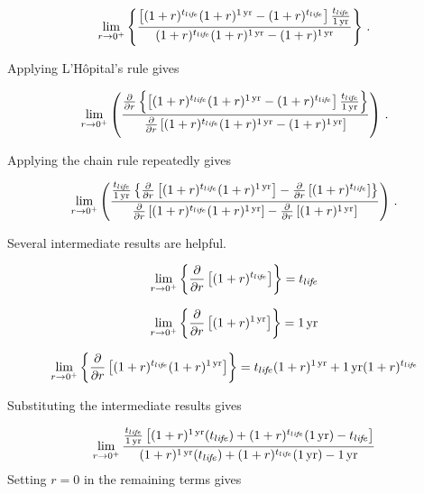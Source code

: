 \begin{equation}
  \lim_{r \to 0^+} \left\{
  \frac{\left[(1 + r)^{\tlife} (1 + r)^{\oneyr} - (1 + r)^{\tlife} \right] \frac{\tlife}{\oneyr}}{(1 + r)^{\tlife} (1 + r)^{\oneyr} - (1 + r)^{\oneyr}}
  \right\} \, .
\end{equation}

Applying L'H\^{o}pital's rule gives

\begin{equation}
  \lim_{r \to 0^+} \left(
  \frac{\frac{\partial}{\partial r} \left\{ \left[(1 + r)^{\tlife} (1 + r)^{\oneyr} - (1 + r)^{\tlife} \right] \frac{\tlife}{\oneyr} \right\}}
  {\frac{\partial}{\partial r} \left[ (1 + r)^{\tlife} (1 + r)^{\oneyr} - (1 + r)^{\oneyr}\right]}
  \right) \, .
\end{equation}

Applying the chain rule repeatedly gives

\begin{equation}
  \lim_{r \to 0^+} \left(
  \frac{\frac{\tlife}{\oneyr} 
      \left\{ \frac{\partial}{\partial r} \left[  (1 + r)^{\tlife} (1 + r)^{\oneyr} \right]  - 
              \frac{\partial}{\partial r} \left[  (1 + r)^{\tlife} \right] 
      \right\}}
  {\frac{\partial}{\partial r} \left[    (1 + r)^{\tlife} (1 + r)^{\oneyr} \right]  - 
              \frac{\partial}{\partial r} \left[  (1 + r)^{\oneyr} \right] }
  \right) \, .
\end{equation}

Several intermediate results are helpful.

\begin{equation}
  \lim_{r \to 0^+} \left\{\frac{\partial}{\partial r} \left[ (1 + r)^{t_{li\!f\!e}} \right] \right\} = t_{li\!f\!e}
\end{equation}

\begin{equation}
  \lim_{r \to 0^+} \left\{\frac{\partial}{\partial r} \left[ (1 + r)^{1\,\mathrm{yr}} \right] \right\} = 1\,\mathrm{yr}
\end{equation}

\begin{equation}
  \lim_{r \to 0^+} \left\{\frac{\partial}{\partial r} \left[ (1 + r)^{t_{li\!f\!e}} (1 + r)^{1\,\mathrm{yr}} \right] \right\} = t_{li\!f\!e} (1 + r)^{1\,\mathrm{yr}}  + 1\,\mathrm{yr} (1 + r)^{t_{li\!f\!e}} 
\end{equation}

Substituting the intermediate results gives

\begin{equation}
  \lim_{r \to 0^+} \frac{\frac{\tlife}{\oneyr}
                         \left[ (1 + r)^{\oneyr} (\tlife) + 
                         (1 + r)^{\tlife} (\oneyr) - 
                         \tlife \right]}
                        {(1 + r)^{\oneyr} (\tlife) + 
                         (1 + r)^{\tlife} (\oneyr) - 
                         \oneyr}
\end{equation}
%
Setting $r = 0$ in the remaining terms gives

